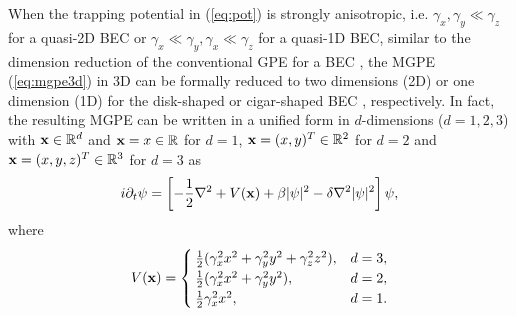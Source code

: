 \documentclass{elsarticle}
\newcommand{\be}{\begin{equation}}
\newcommand{\ee}{\end{equation}}
\newcommand{\bx}{{\bf x} }
\begin{document}



When the trapping potential in (\ref{eq:pot}) is strongly anisotropic, i.e. $\gamma_x,\gamma_y\ll\gamma_z$ for a quasi-2D BEC or $\gamma_x\ll\gamma_y,\gamma_x\ll\gamma_z$ for a quasi-1D
BEC, similar to
the dimension reduction of the conventional GPE for a BEC \cite{Bao2013,Bao2014,Ben,PitaevskiiStringari},
the MGPE (\ref{eq:mgpe3d}) in 3D can be formally reduced
to two dimensions (2D) or one dimension (1D) for the  disk-shaped or cigar-shaped BEC \cite{Ruan, Veksler}, respectively.
In fact, the resulting MGPE can be written
in a unified form in $d$-dimensions ($d=1,2,3$) with $\bx\in \mathbb R^d$  and $\bx=x\in\mathbb R$ for $d=1$,
$\bx=(x,y)^T\in\mathbb R^2$ for $d=2$ and
$\bx=(x,y,z)^T\in\mathbb R^3$   for $d=3$ as
\be\label{eq:mgpe}
 i\partial_t \psi=\left[-\frac{1}{2}\nabla^2
+V(\bx)
+\beta|\psi|^2-\delta\nabla^2|\psi|^2\right]\psi,
 \ee
where
\be\label{eq:potential:ho}
V(\bx)=\begin{cases}
\frac12(\gamma_x^2x^2+\gamma_y^2y^2+\gamma_z^2z^2),& d=3,\\
\frac12(\gamma_x^2x^2+\gamma_y^2y^2),& d=2,\\
\frac12\gamma_x^2x^2, &d=1.
\end{cases}
\ee
\end{document}
